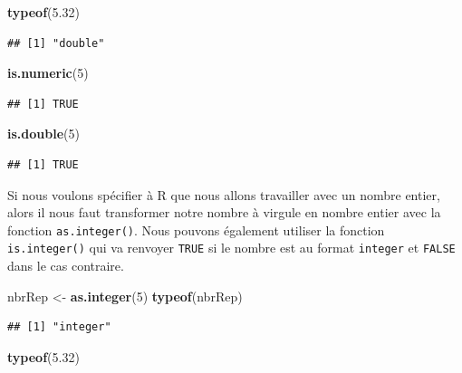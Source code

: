 \documentclass[]{book}
\newenvironment{Shaded}{\begin{snugshade}}{\end{snugshade}}
\newcommand{\KeywordTok}[1]{\textcolor[rgb]{0.13,0.29,0.53}{\textbf{#1}}}
\newcommand{\DecValTok}[1]{\textcolor[rgb]{0.00,0.00,0.81}{#1}}
\newcommand{\FloatTok}[1]{\textcolor[rgb]{0.00,0.00,0.81}{#1}}
\newcommand{\StringTok}[1]{\textcolor[rgb]{0.31,0.60,0.02}{#1}}
\newcommand{\NormalTok}[1]{#1}
\begin{document}
\begin{Shaded}
\begin{Highlighting}[]
\KeywordTok{typeof}\NormalTok{(}\FloatTok{5.32}\NormalTok{)}
\end{Highlighting}
\end{Shaded}

\begin{verbatim}
## [1] "double"
\end{verbatim}

\begin{Shaded}
\begin{Highlighting}[]
\KeywordTok{is.numeric}\NormalTok{(}\DecValTok{5}\NormalTok{)}
\end{Highlighting}
\end{Shaded}

\begin{verbatim}
## [1] TRUE
\end{verbatim}

\begin{Shaded}
\begin{Highlighting}[]
\KeywordTok{is.double}\NormalTok{(}\DecValTok{5}\NormalTok{)}
\end{Highlighting}
\end{Shaded}

\begin{verbatim}
## [1] TRUE
\end{verbatim}

Si nous voulons spécifier à R que nous allons travailler avec un nombre
entier, alors il nous faut transformer notre nombre à virgule en nombre
entier avec la fonction \texttt{as.integer()}. Nous pouvons également
utiliser la fonction \texttt{is.integer()} qui va renvoyer \texttt{TRUE}
si le nombre est au format \texttt{integer} et \texttt{FALSE} dans le
cas contraire.

\begin{Shaded}
\begin{Highlighting}[]
\NormalTok{nbrRep <-}\StringTok{ }\KeywordTok{as.integer}\NormalTok{(}\DecValTok{5}\NormalTok{)}
\KeywordTok{typeof}\NormalTok{(nbrRep)}
\end{Highlighting}
\end{Shaded}

\begin{verbatim}
## [1] "integer"
\end{verbatim}

\begin{Shaded}
\begin{Highlighting}[]
\KeywordTok{typeof}\NormalTok{(}\FloatTok{5.32}\NormalTok{)}
\end{Highlighting}
\end{Shaded}
\end{document}
